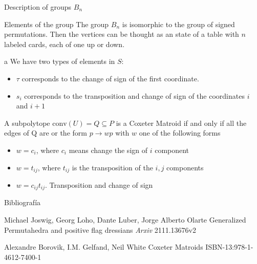 \documentclass{beamer}
\begin{document}
\begin{frame}{Description of groups $B_n$}
 \begin{block}{Elements of the group}
The group $B_n$ is isomorphic to the group of signed permutations. Then the vertices can be thought as an state of a table with $n$ labeled cards, each of one up or down.
 \end{block} 
 \begin{block}{a}
   We have two types of elements in $S$:
    \begin{itemize}[topsep=-6pt, itemsep=0pt]
     \item $\tau $ corresponds to the change of sign of the first coordinate.
	 \item $s_i$ corresponds to the transposition and change of sign of the coordinates $i$ and  $i+1$
   \end{itemize}
 \end{block}
 \begin{theorem}[Theorem]
A subpolytope $\text{conv}(U) = Q \subseteq P$ is a Coxeter Matroid if and only if all the edges of Q are or the form $p \to  wp $ with $w$ one of the following forms
 \begin{itemize}[topsep=-6pt, itemsep=0pt]
  \item $w = c_i$, where  $c_i$ means change the sign of  $i$ component
  \item  $w = t_{ij}$, where $t_{ij}$ is the transposition of the $i, j$ components
  \item  $w = c_{ij}t_{ij}$. Transposition and change of sign
\end{itemize}
 \end{theorem}
\end{frame}


\begin{frame}{Bibliografía}
\footnotesize{
\begin{thebibliography}{99} %
 Michael Joswig, Georg Loho, Dante Luber, Jorge Alberto Olarte
\newblock Generalized Permutahedra and positive flag dressians
\newblock \emph{Arxiv} 2111.13676v2
\end{thebibliography}

\begin{thebibliography}{99} %
 Alexandre Borovik, I.M. Gelfand, Neil White
\newblock Coxeter Matroids
\newblock ISBN-13:978-1-4612-7400-1
\end{thebibliography}

}
\end{frame}
\end{document}
